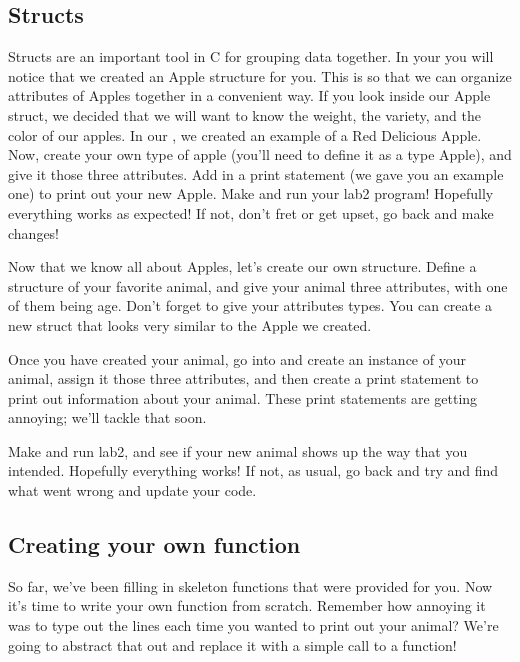 \documentclass{tufte-handout}
\begin{document}
\subsection{Structs}


Structs are an important tool in C for grouping data together.  In
your  you will notice that we created an Apple structure for you.  This is so that we can organize attributes of Apples together in a convenient way.  If you look inside our Apple struct, we decided that we will want to know the weight, the variety, and the color of our apples.  In our , we created an example of a Red Delicious Apple.  Now, create your own type of apple (you'll need to define it as a type Apple), and give it those three attributes.  Add in a print statement (we gave you an example one) to print out your new Apple.  Make and run your lab2 program!  Hopefully everything works as expected!  If not, don't fret or get upset, go back and make changes!


Now that we know all about Apples, let's create our own structure.  Define a structure of your favorite animal, and give your animal three attributes, with one of them being age. Don't forget to give your attributes types. You can create a new struct that looks very similar to the Apple we created.

Once you have created your animal, go into  and create an instance of your animal, assign it those three attributes, and then create a print statement to print out information about your animal.  These print statements are getting annoying; we'll tackle that soon.

Make and run lab2, and see if your new animal shows up the way that you intended.  Hopefully everything works!  If not, as usual, go back and try and find what went wrong and update your code. 



\subsection{Creating your own function}
So far, we've been filling in skeleton functions that were provided for
you. Now it's time to write your own function from scratch.  Remember
how annoying it was to type out the  lines each time you wanted to print out your animal?  We're going to abstract that out and replace it with a simple call to a function! 
\end{document}
